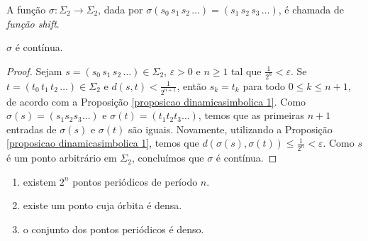 \begin{definition}
A função $\sigma: \Sigma_2 \to \Sigma_2$, dada por $\sigma(s_0\, s_1\, s_2\, \dots) = (s_1\, s_2\, s_3\, \dots)$, é chamada de \textit{função shift}.
\end{definition}

\begin{proposition}
$\sigma$ é contínua.
\end{proposition}

\begin{proof}
Sejam $s = (s_0\, s_1\, s_2\, \dots) \in \Sigma_2$, $\varepsilon > 0$ e $n \geq 1$ tal que $\frac{1}{2^n} < \varepsilon$. Se $t = (t_0\, t_1\, t_2\, \dots) \in \Sigma_ 2$ e $d(s, t) < \frac{1}{2^{n+1}}$, então $s_k = t_k$ para todo $0 \leq k \leq n+1$, de acordo com a Proposição  \ref{proposicao dinamicasimbolica 1}. Como $\sigma(s) = (s_1s_2s_3\dots)$ e $\sigma(t) = (t_1t_2t_3\dots)$, temos que as primeiras $n+1$ entradas de $\sigma(s)$ e $\sigma(t)$ são iguais. Novamente, utilizando a Proposição \ref{proposicao dinamicasimbolica 1}, temos que $d(\sigma(s), \sigma(t)) \leq \frac{1}{2^n} < \varepsilon$. Como $s$ é um ponto arbitrário em $\Sigma_2$, concluímos que $\sigma$ é contínua.
\end{proof}

\begin{proposition}
\begin{enumerate}
\item existem $2^n$ pontos periódicos de período $n$.
\item existe um ponto cuja órbita é densa.
\item o conjunto dos pontos periódicos é denso.
\end{enumerate}
\end{proposition}

